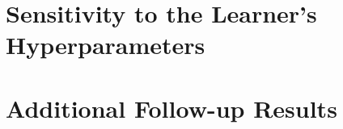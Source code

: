 \begin{table}[t]
\centering
\small
\setlength{\tabcolsep}{3pt}
\caption{Success under shifts at held-out lengths 7--9, without retraining (mean over 10 seeds $\pm$ half-width of the 95\% $t$-interval). The planner is recomputed for each shifted environment. $p_f$: fault probability (train: 0.8); $c_V$: verification cost (train: 1); slack: extra budget beyond the chain length (train: 6); clean/noisy cue: hit/false-positive rates $0.95/0.05$ and $0.60/0.35$ (train: $0.85/0.15$).}
\label{tab:shifts}
\resizebox{\linewidth}{!}{}
\end{table}

\section{Sensitivity to the Learner's Hyperparameters}
\label{app:sensitivity}



\section{Additional Follow-up Results}
\label{app:followups}

